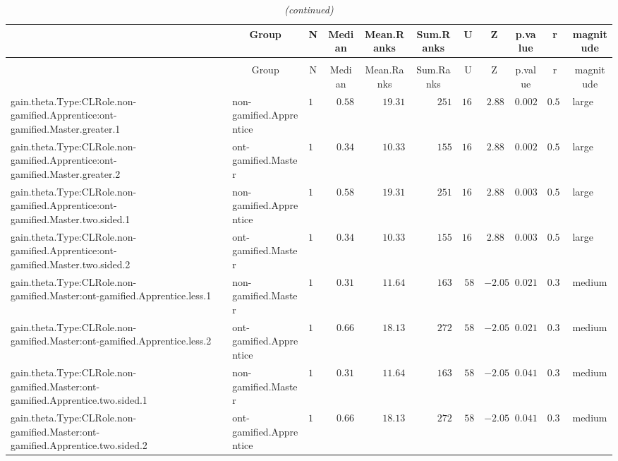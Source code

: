 \documentclass[6pt]{article}
\begin{document}
\setlongtables\begin{landscape}{\scriptsize
\begin{longtable}{llrrrrrrrrl}\caption{Descriptive statistic of the pair wilcoxon analysis } \tabularnewline
\hline\hline
\multicolumn{1}{l}{}&\multicolumn{1}{c}{Group}&\multicolumn{1}{c}{N}&\multicolumn{1}{c}{Median}&\multicolumn{1}{c}{Mean.Ranks}&\multicolumn{1}{c}{Sum.Ranks}&\multicolumn{1}{c}{U}&\multicolumn{1}{c}{Z}&\multicolumn{1}{c}{p.value}&\multicolumn{1}{c}{r}&\multicolumn{1}{c}{magnitude}\tabularnewline
\hline
\endfirsthead\caption[]{\em (continued)} \tabularnewline
\hline
\multicolumn{1}{l}{}&\multicolumn{1}{c}{Group}&\multicolumn{1}{c}{N}&\multicolumn{1}{c}{Median}&\multicolumn{1}{c}{Mean.Ranks}&\multicolumn{1}{c}{Sum.Ranks}&\multicolumn{1}{c}{U}&\multicolumn{1}{c}{Z}&\multicolumn{1}{c}{p.value}&\multicolumn{1}{c}{r}&\multicolumn{1}{c}{magnitude}\tabularnewline
\hline
\endhead
\hline
\endfoot
\label{result}
gain.theta.Type:CLRole.non-gamified.Apprentice:ont-gamified.Master.greater.1&non-gamified.Apprentice&$13$&$0.58$&$19.31$&$251$&$160$&$ 2.88$&$0.002$&$0.544$&large\tabularnewline
gain.theta.Type:CLRole.non-gamified.Apprentice:ont-gamified.Master.greater.2&ont-gamified.Master&$15$&$0.34$&$10.33$&$155$&$160$&$ 2.88$&$0.002$&$0.544$&large\tabularnewline
gain.theta.Type:CLRole.non-gamified.Apprentice:ont-gamified.Master.two.sided.1&non-gamified.Apprentice&$13$&$0.58$&$19.31$&$251$&$160$&$ 2.88$&$0.003$&$0.544$&large\tabularnewline
gain.theta.Type:CLRole.non-gamified.Apprentice:ont-gamified.Master.two.sided.2&ont-gamified.Master&$15$&$0.34$&$10.33$&$155$&$160$&$ 2.88$&$0.003$&$0.544$&large\tabularnewline
gain.theta.Type:CLRole.non-gamified.Master:ont-gamified.Apprentice.less.1&non-gamified.Master&$14$&$0.31$&$11.64$&$163$&$ 58$&$-2.05$&$0.021$&$0.381$&medium\tabularnewline
gain.theta.Type:CLRole.non-gamified.Master:ont-gamified.Apprentice.less.2&ont-gamified.Apprentice&$15$&$0.66$&$18.13$&$272$&$ 58$&$-2.05$&$0.021$&$0.381$&medium\tabularnewline
gain.theta.Type:CLRole.non-gamified.Master:ont-gamified.Apprentice.two.sided.1&non-gamified.Master&$14$&$0.31$&$11.64$&$163$&$ 58$&$-2.05$&$0.041$&$0.381$&medium\tabularnewline
gain.theta.Type:CLRole.non-gamified.Master:ont-gamified.Apprentice.two.sided.2&ont-gamified.Apprentice&$15$&$0.66$&$18.13$&$272$&$ 58$&$-2.05$&$0.041$&$0.381$&medium\tabularnewline

\end{longtable}}
\end{landscape}
\end{document}
